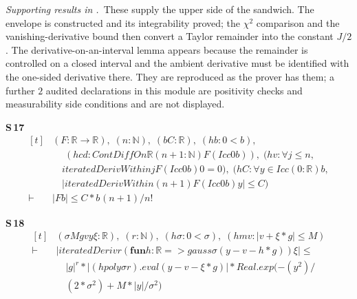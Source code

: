 
\noindent\emph{Supporting results in .}~These supply the upper side of the sandwich. The envelope is constructed and its integrability proved; the $\chi^{2}$ comparison and the vanishing-derivative bound then convert a Taylor remainder into the constant $J/2$. The derivative-on-an-interval lemma appears because the remainder is controlled on a closed interval and the ambient derivative must be identified with the one-sided derivative there. They are reproduced as the prover has them; a further $2$ audited declarations in this module are positivity checks and measurability side conditions and are not displayed.

\noindent\textbf{S\,17}\quad{}
{\footnotesize\[ \begin{aligned}[t]
&(\mathit{F} : \mathbb{R} \to \mathbb{R} ),\; (\mathit{n} : \mathbb{N} ),\; (\mathit{b} \mathit{C} : \mathbb{R} ),\; (\mathit{hb} : 0 < \mathit{b}),\\
&\quad \; (\mathit{hcd} : \mathit{ContDiffOn} \mathbb{R} (\mathit{n} + 1 : \mathbb{N} ) \mathit{F} (\mathit{Icc} 0 \mathit{b})),\; (\mathit{hv} : \forall \mathit{j} \leq \mathit{n},\\
&\quad \mathit{iteratedDerivWithin} \mathit{j} \mathit{F} (\mathit{Icc} 0 \mathit{b}) 0 = 0),\; (\mathit{hC} : \forall \mathit{y} \in \mathit{Icc} (0:\mathbb{R} ) \mathit{b},\\
&\quad |\mathit{iteratedDerivWithin} (\mathit{n} + 1) \mathit{F} (\mathit{Icc} 0 \mathit{b}) \mathit{y}| \leq \mathit{C})\\
\vdash\;&|\mathit{F} \mathit{b}| \leq \mathit{C} * \mathit{b} ^{} (\mathit{n} + 1) / \mathit{n} !
\end{aligned} \]}

\noindent\textbf{S\,18}\quad{}
{\footnotesize\[ \begin{aligned}[t]
&(\sigma \mathit{M} \mathit{g} \mathit{v} \mathit{y} \xi : \mathbb{R} ),\; (\mathit{r} : \mathbb{N} ),\; (\mathit{hσ} : 0 < \sigma ),\; (\mathit{hmv} : |\mathit{v} + \xi * \mathit{g}| \leq \mathit{M})\\
\vdash\;&|\mathit{iteratedDeriv} \mathit{r} (\mathbf{fun} \mathit{h} : \mathbb{R} => \mathit{gauss} \sigma (\mathit{y} - \mathit{v} - \mathit{h} * \mathit{g})) \xi | \leq\\
&\quad |\mathit{g}| ^{\mathit{r}} * |(\mathit{hpoly} \sigma \mathit{r}).\mathit{eval} (\mathit{y} - \mathit{v} - \xi * \mathit{g})| * \mathit{Real}.\mathit{exp} (-(\mathit{y} ^{2}) /\\
&\quad (2 * \sigma ^{2}) + \mathit{M} * |\mathit{y}| / \sigma ^{2})
\end{aligned} \]}

